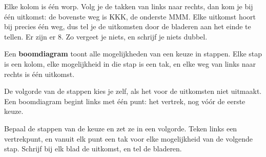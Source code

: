 Elke kolom is één worp. Volg je de takken van links naar rechts, dan kom je bij één uitkomst: de bovenste weg is KKK, de onderste MMM. Elke uitkomst hoort bij precies één weg, dus tel je de uitkomsten door de bladeren aan het einde te tellen. Er zijn er 8. Zo vergeet je niets, en schrijf je niets dubbel.

\begin{theorie}
Een \textbf{\textcolor{accent}{boomdiagram}} toont alle mogelijkheden van een keuze in stappen. Elke stap is een kolom, elke mogelijkheid in die stap is een tak, en elke weg van links naar rechts is één uitkomst.
\end{theorie}

De volgorde van de stappen kies je zelf, als het voor de uitkomsten niet uitmaakt. Een boomdiagram begint links met één punt: het vertrek, nog vóór de eerste keuze.


\begin{werkwijze}
Bepaal de stappen van de keuze en zet ze in een volgorde. Teken links een vertrekpunt, en vanuit elk punt een tak voor elke mogelijkheid van de volgende stap. Schrijf bij elk blad de uitkomst, en tel de bladeren.
\end{werkwijze}

